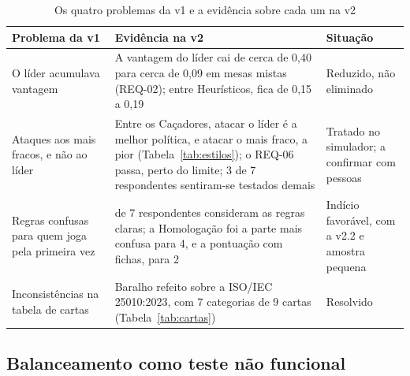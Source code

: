 \begin{table}[ht]
  \centering
  \caption{Os quatro problemas da v1 e a evidência sobre cada um na v2}
  \label{tab:sintese}
  \footnotesize
  \begin{tabularx}{\linewidth}{>{\raggedright\arraybackslash}p{2.9cm} >{\raggedright\arraybackslash}X >{\raggedright\arraybackslash}p{3.4cm}}
    \toprule
    Problema da v1 & Evidência na v2 & Situação \\
    \midrule
    O líder acumulava vantagem & A vantagem do líder cai de cerca de 0,40 para cerca de 0,09 em mesas mistas (REQ-02); entre Heurísticos, fica de 0,15 a 0,19 & Reduzido, não eliminado \\
    Ataques aos mais fracos, e não ao líder & Entre os Caçadores, atacar o líder é a melhor política, e atacar o mais fraco, a pior (Tabela~\ref{tab:estilos}); o REQ-06 passa, perto do limite; 3 de 7 respondentes sentiram-se testados demais & Tratado no simulador; a confirmar com pessoas \\
    Regras confusas para quem joga pela primeira vez & 6 de 7 respondentes consideram as regras claras; a Homologação foi a parte mais confusa para 4, e a pontuação com fichas, para 2 & Indício favorável, com a v2.2 e amostra pequena \\
    Inconsistências na tabela de cartas & Baralho refeito sobre a ISO/IEC 25010:2023, com 7 categorias de 9 cartas (Tabela~\ref{tab:cartas}) & Resolvido \\
    \bottomrule
  \end{tabularx}
\end{table}

\subsection{Balanceamento como teste não funcional}

